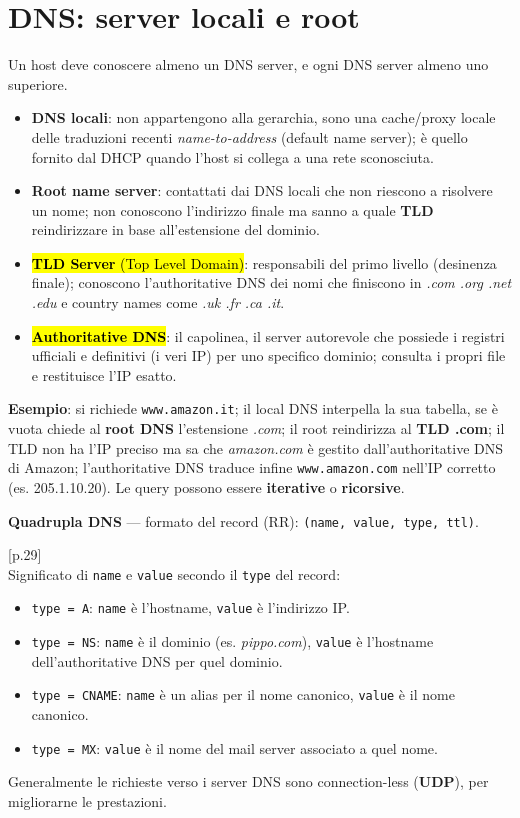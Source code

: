 \documentclass[11pt,a4paper]{report}
\newcommand{\pagemark}[1]{\marginpar{\footnotesize\color{gray}p.#1}}
\begin{document}
\section{DNS: server locali e root}\pagemark{28}
Un host deve conoscere almeno un DNS server, e ogni DNS server almeno uno superiore.
\begin{itemize}[noitemsep]
\item \textbf{DNS locali}: non appartengono alla gerarchia, sono una cache/proxy locale delle traduzioni recenti \emph{name-to-address} (default name server); è quello fornito dal DHCP quando l'host si collega a una rete sconosciuta.
\item \textbf{Root name server}: contattati dai DNS locali che non riescono a risolvere un nome; non conoscono l'indirizzo finale ma sanno a quale \textbf{TLD} reindirizzare in base all'estensione del dominio.
\item \hl{\textbf{TLD Server} (Top Level Domain)}: responsabili del primo livello (desinenza finale); conoscono l'authoritative DNS dei nomi che finiscono in \emph{.com .org .net .edu} e country names come \emph{.uk .fr .ca .it}.
\item \hl{\textbf{Authoritative DNS}}: il capolinea, il server autorevole che possiede i registri ufficiali e definitivi (i veri IP) per uno specifico dominio; consulta i propri file e restituisce l'IP esatto.
\end{itemize}
\textbf{Esempio}: si richiede \texttt{www.amazon.it}; il local DNS interpella la sua tabella, se è vuota chiede al \textbf{root DNS} l'estensione \emph{.com}; il root reindirizza al \textbf{TLD .com}; il TLD non ha l'IP preciso ma sa che \emph{amazon.com} è gestito dall'authoritative DNS di Amazon; l'authoritative DNS traduce infine \texttt{www.amazon.com} nell'IP corretto (es. 205.1.10.20). Le query possono essere \textbf{iterative} o \textbf{ricorsive}.

\textbf{Quadrupla DNS} --- formato del record (RR): \texttt{(name, value, type, ttl)}.

\noindent\hfill{\footnotesize\color{gray}[p.29]}\\
Significato di \texttt{name} e \texttt{value} secondo il \texttt{type} del record:
\begin{itemize}[noitemsep]
\item \texttt{type = A}: \texttt{name} è l'hostname, \texttt{value} è l'indirizzo IP.
\item \texttt{type = NS}: \texttt{name} è il dominio (es. \emph{pippo.com}), \texttt{value} è l'hostname dell'authoritative DNS per quel dominio.
\item \texttt{type = CNAME}: \texttt{name} è un alias per il nome canonico, \texttt{value} è il nome canonico.
\item \texttt{type = MX}: \texttt{value} è il nome del mail server associato a quel nome.
\end{itemize}
Generalmente le richieste verso i server DNS sono connection-less (\textbf{UDP}), per migliorarne le prestazioni.
\end{document}
